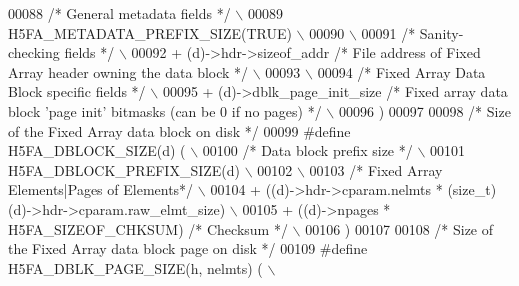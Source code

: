 \begin{DoxyCode}
00088 \textcolor{preprocessor}{    }\textcolor{comment}{/* General metadata fields */}\textcolor{preprocessor}{                                           \(\backslash\)}
00089 \textcolor{preprocessor}{    H5FA\_METADATA\_PREFIX\_SIZE(TRUE)                                         \(\backslash\)}
00090 \textcolor{preprocessor}{                                                                            \(\backslash\)}
00091 \textcolor{preprocessor}{    }\textcolor{comment}{/* Sanity-checking fields */}\textcolor{preprocessor}{                                            \(\backslash\)}
00092 \textcolor{preprocessor}{    + (d)->hdr->sizeof\_addr        }\textcolor{comment}{/* File address of Fixed Array header owning the data block */}\textcolor{preprocessor}{   \(\backslash\)}
00093 \textcolor{preprocessor}{                                                                            \(\backslash\)}
00094 \textcolor{preprocessor}{    }\textcolor{comment}{/* Fixed Array Data Block specific fields */}\textcolor{preprocessor}{                            \(\backslash\)}
00095 \textcolor{preprocessor}{    + (d)->dblk\_page\_init\_size }\textcolor{comment}{/* Fixed array data block 'page init' bitmasks (can be 0 if no pages) */}\textcolor{preprocessor}{ \(\backslash\)}
00096 \textcolor{preprocessor}{    )}
00097 
00098 \textcolor{comment}{/* Size of the Fixed Array data block on disk */}
00099 \textcolor{preprocessor}{#define H5FA\_DBLOCK\_SIZE(d)  (                                              \(\backslash\)}
00100 \textcolor{preprocessor}{    }\textcolor{comment}{/* Data block prefix size  */}\textcolor{preprocessor}{                                           \(\backslash\)}
00101 \textcolor{preprocessor}{    H5FA\_DBLOCK\_PREFIX\_SIZE(d)                                              \(\backslash\)}
00102 \textcolor{preprocessor}{                                                                            \(\backslash\)}
00103 \textcolor{preprocessor}{    }\textcolor{comment}{/* Fixed Array Elements|Pages of Elements*/}\textcolor{preprocessor}{                             \(\backslash\)}
00104 \textcolor{preprocessor}{    + ((d)->hdr->cparam.nelmts * (size\_t)(d)->hdr->cparam.raw\_elmt\_size)    \(\backslash\)}
00105 \textcolor{preprocessor}{    + ((d)->npages * H5FA\_SIZEOF\_CHKSUM)        }\textcolor{comment}{/* Checksum */}\textcolor{preprocessor}{              \(\backslash\)}
00106 \textcolor{preprocessor}{    )}
00107 
00108 \textcolor{comment}{/* Size of the Fixed Array data block page on disk */}
00109 \textcolor{preprocessor}{#define H5FA\_DBLK\_PAGE\_SIZE(h, nelmts)     (                                  \(\backslash\)}

\end{DoxyCode}
